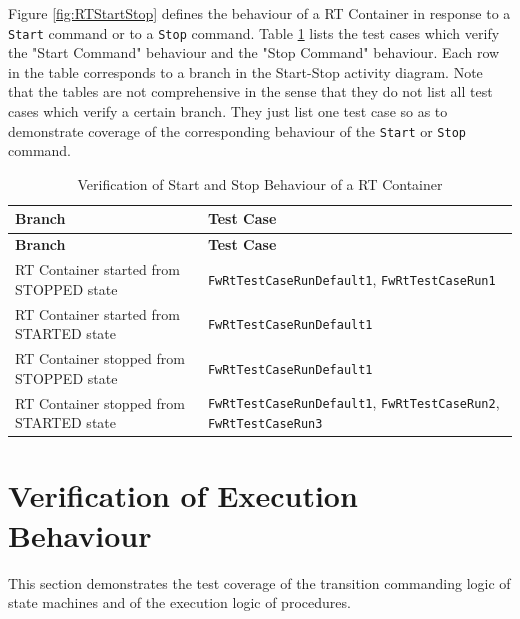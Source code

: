 \documentclass[requirements]{../fwprofile}
\begin{document}
\label{Appendix_C_RT_Start_Stop}
Figure \ref{fig:RTStartStop} defines the behaviour of a RT Container in response to a 
\texttt{Start} command or to a \texttt{Stop} command. Table \ref{tab:RT_StartStop} lists the test cases which verify the "Start Command" behaviour and the "Stop Command" behaviour. Each row in the table corresponds to a branch in the Start-Stop activity diagram. Note that the tables are not comprehensive in the sense that they do not list all test cases which verify a certain branch. They just list one test case so as to demonstrate coverage  of the corresponding behaviour of the \texttt{Start} or \texttt{Stop} command.

\begin{longtable}{|p{6.9cm}|p{4.3cm}|}
\caption{Verification of Start and Stop Behaviour of a RT Container}\label{tab:RT_StartStop} \\
\hline
\rowcolor{gray}
\textbf{Branch} & \textbf{Test Case} \\
\hline
\endfirsthead
\rowcolor{gray}
\textbf{Branch} & \textbf{Test Case} \\
\hline
\endhead
RT Container started from STOPPED state & \texttt{FwRtTestCaseRunDefault1}, \texttt{FwRtTestCaseRun1} \\
\hline
RT Container started from STARTED state & \texttt{FwRtTestCaseRunDefault1} \\
\hline
RT Container stopped from STOPPED state & \texttt{FwRtTestCaseRunDefault1} \\
\hline
RT Container stopped from STARTED state & \texttt{FwRtTestCaseRunDefault1}, \texttt{FwRtTestCaseRun2}, \texttt{FwRtTestCaseRun3} \\
\hline
\end{longtable}


\section{Verification of Execution Behaviour}
This section demonstrates the test coverage of the transition commanding logic
of state machines and of the execution logic of procedures.

\end{document}
